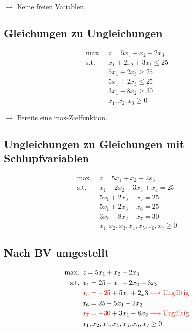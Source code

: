 \documentclass[a4paper,11pt]{article}
\begin{document}
$\to$ Keine freien Variablen. \\

\subsection*{Gleichungen zu Ungleichungen}
\begin{align*}
\text{max. } & z = 5x_1 + x_2 - 2x_3 \\
\text{s.t. } & x_1 + 2x_2 + 3x_3 \le 25 \\
& 5x_1 + 2x_3 \ge 25 \\
& 5x_1 + 2x_3 \le 25 \\
& 3x_1 - 8x_2 \ge 30 \\
& x_1, x_2, x_3 \ge 0
\end{align*}

$\to$ Bereits eine max-Zielfunktion. \\

\subsection*{Ungleichungen zu Gleichungen mit Schlupfvariablen}
\begin{align*}
\text{max. } & z = 5x_1 + x_2 - 2x_3 \\
\text{s.t. } & x_1 + 2x_2 + 3x_3 + x_4 = 25 \\
& 5x_1 + 2x_3 - x_5 = 25 \\
& 5x_1 + 2x_3 + x_6 = 25 \\
& 3x_1 - 8x_2 - x_7 = 30 \\
& x_1, x_2, x_3, x_4, x_5, x_6, x_7 \ge 0
\end{align*}

\subsection*{Nach BV umgestellt}
\begin{align*}
\text{max. } & z = 5x_1 + x_2 - 2x_3 \\
\text{s.t. } & x_4 = 25 - x_1 - 2x_2 - 3x_3 \\
& {\color{red} x_5 = -25} + 5x_1 + 2_x3 \color{red} \longrightarrow \text{Ungültig} \\
& x_6 = 25 - 5x_1 - 2x_3 \\
& {\color{red} x_7 = -30} + 3x_1 - 8x_2 \color{red} \longrightarrow \text{Ungültig} \\
& x_1, x_2, x_3, x_4, x_5, x_6, x_7 \ge 0
\end{align*}
\end{document}
